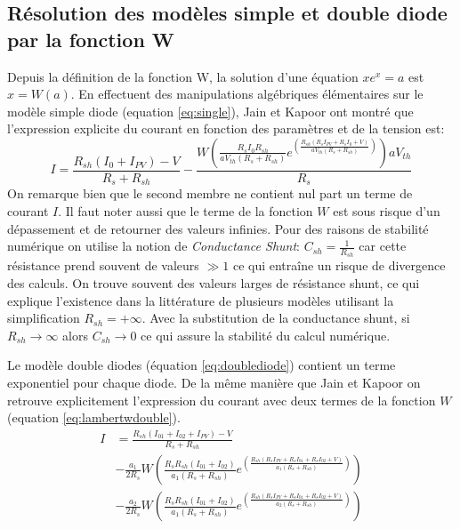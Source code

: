 \subsection{Résolution des modèles simple et double diode par la fonction W}
Depuis la définition de la fonction W, la solution d'une équation $xe^x = a$ est $x = W(a)$. En effectuent des manipulations algébriques élémentaires sur le modèle simple diode (equation \ref{eq:single}), Jain et Kapoor ont montré que l'expression explicite du courant en fonction des paramètres et de la tension est:
\begin{equation}
  \label{eq:lambertwsingle}
  I = \frac{R_{sh}(I_0 + I_{PV}) - V}{R_s + R_{sh}} - \frac{W\left(\frac{R_s I_0 R_{sh}}{a V_{th}(R_s + R_{sh})}e^{\left(\frac{R_{sh}(R_s I_{PV} + R_s I_0 + V)}{a V_{th} (R_s + R_{sh})}\right)}\right)aV_{th}}{R_s}
\end{equation}
On remarque bien que le second membre ne contient nul part un terme de courant $I$. Il faut noter aussi que le terme de la fonction $W$ est sous risque d'un dépassement et de retourner des valeurs infinies. Pour des raisons de stabilité numérique on utilise la notion de \textit{Conductance Shunt}: $C_{sh} = \frac{1}{R_{sh}}$ car cette résistance prend souvent de valeurs $\gg 1$ ce qui entraîne un risque de divergence des calculs. On trouve souvent des valeurs larges de résistance shunt, ce qui explique l'existence dans la littérature de plusieurs modèles utilisant la simplification $R_{sh} = + \infty$. Avec la substitution de la conductance shunt, si $R_{sh}\rightarrow\infty$ alors $C_{sh} \rightarrow 0$ ce qui assure la stabilité du calcul numérique.

Le modèle double diodes (équation \ref{eq:doublediode}) contient un terme exponentiel pour chaque diode. De la même manière que Jain et Kapoor on retrouve explicitement l'expression du courant avec deux termes de la fonction $W$ (equation \ref{eq:lambertwdouble}).
\begin{equation}
  \label{eq:lambertwdouble}
  \begin{split}
    I &= \frac{R_{sh} (I_{01} + I_{02} + I_{PV}) - V}{R_s + R_{sh}}\\ 
    &- \frac{a_1}{2 R_s} W\left( \frac{R_s R_{sh}(I_{01} + I_{02})}{a_1 (R_s + R_{sh})}e^{\left(\frac{R_{sh}(R_s I_{PV} + R_s I_{01} + R_s I_{02} + V)}{a_1 (R_s + R_{sh})}\right)}\right)\\ 
    &- \frac{a_2}{2 R_s} W\left( \frac{R_s R_{sh}(I_{01} + I_{02})}{a_1 (R_s + R_{sh})}e^{\left(\frac{R_{sh}(R_s I_{PV} + R_s I_{01} + R_s I_{02} + V)}{a_2 (R_s + R_{sh})}\right)}\right)
  \end{split}
\end{equation}

